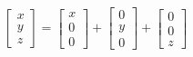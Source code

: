 \documentclass[preview]{standalone}
\begin{document}
$$\begin{bmatrix}x\\y\\z\end{bmatrix} = \begin{bmatrix}x\\0\\0\end{bmatrix} + \begin{bmatrix}0\\y\\0\end{bmatrix} + \begin{bmatrix}0\\0\\z\end{bmatrix}$$
\end{document}
